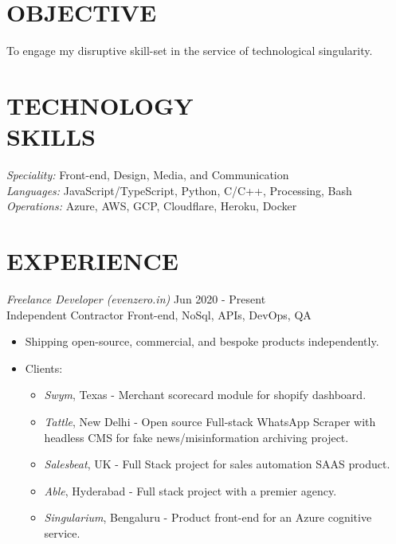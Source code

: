 \documentclass[margin, 10pt]{res} %
\begin{document}
\begin{resume}

\section{OBJECTIVE}  
To engage my disruptive skill-set in the service of technological singularity.

\section{TECHNOLOGY \\ SKILLS} 

{\sl Speciality:} Front-end, Design, Media, and Communication \\
{\sl Languages:} JavaScript/TypeScript, Python, C/C++, Processing, Bash\\
{\sl Operations:} Azure, AWS, GCP, Cloudflare, Heroku, Docker


\section{EXPERIENCE}

{\sl Freelance Developer (evenzero.in)} \hfill Jun 2020 - Present \\
 Independent Contractor \hfill {\scriptsize Front-end, NoSql, APIs, DevOps, QA}
\begin{itemize}
\item Shipping open-source, commercial, and bespoke products independently.
\item Clients:
\begin{itemize}
\item {\sl Swym}, Texas - Merchant scorecard module for shopify dashboard.
\item {\sl Tattle}, New Delhi - Open source Full-stack WhatsApp Scraper with headless CMS for fake news/misinformation archiving project. 
\item {\sl Salesbeat}, UK - Full Stack project for sales automation SAAS product.
\item {\sl Able}, Hyderabad - Full stack project with a premier agency.
\item {\sl Singularium}, Bengaluru - Product front-end for an Azure cognitive service.
\end{itemize}
\end{itemize}


\end{resume}
\end{document}
